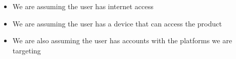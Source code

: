 \begin{itemize}
  \item We are assuming the user has internet access
  \item We are assuming the user has a device that can access the product
  \item We are also assuming the user has accounts with the platforms we are targeting
\end{itemize}
